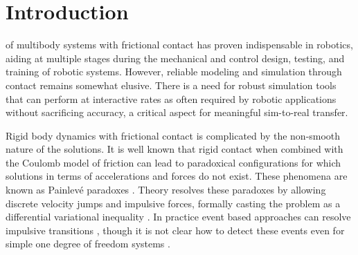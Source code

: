 
\section{Introduction}
\label{sec:introduction}

 of multibody systems with frictional contact has
proven indispensable in robotics, aiding at multiple stages during the
mechanical and control design, testing, and training of robotic systems.
However, reliable modeling and simulation through contact remains somewhat
elusive. There is a need for robust simulation tools that can perform at
interactive rates as often required by robotic applications without sacrificing
accuracy, a critical aspect for meaningful sim-to-real transfer. 

Rigid body dynamics with frictional contact is complicated by the non-smooth
nature of the solutions. It is well known \cite{bib:baraff1993issues} that rigid
contact when combined with the Coulomb model of friction can lead to paradoxical
configurations for which solutions in terms of accelerations and forces do not
exist. These phenomena are known as Painlev\'e paradoxes
\cite{bib:hogan2017regularization}. Theory resolves these paradoxes by allowing
discrete velocity jumps and impulsive forces, formally casting the problem as a
differential variational inequality \cite{bib:pang2008differential}. In practice
event based approaches can resolve impulsive transitions \cite{bib:haug1986},
though it is not clear how to detect these events even for simple one degree of
freedom systems \cite{bib:hogan2017regularization}.

